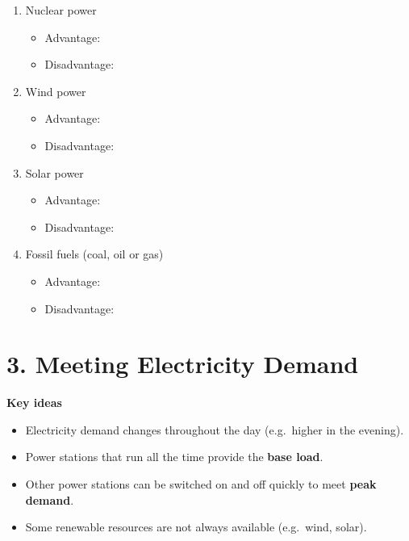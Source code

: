 \documentclass[11pt,a4paper]{article}
\begin{document}
\begin{enumerate}[label=\arabic*)]
    \item Nuclear power
    \begin{itemize}
        \item Advantage:
        \vspace{5cm}
        \item Disadvantage:
        \vspace{6cm}
    \end{itemize}

    \item Wind power
    \begin{itemize}
        \item Advantage:
        \vspace{3cm}
        \item Disadvantage:
        \vspace{3cm}
    \end{itemize}

    \item Solar power
    \begin{itemize}
        \item Advantage:
        \vspace{3cm}
        \item Disadvantage:
        \vspace{3cm}
    \end{itemize}

    \item Fossil fuels (coal, oil or gas)
    \begin{itemize}
        \item Advantage:
        \vspace{3cm}
        \item Disadvantage:
        \vspace{3cm}
    \end{itemize}
\end{enumerate}

\newpage

\section*{3. Meeting Electricity Demand}

\textbf{Key ideas}

\begin{itemize}[noitemsep]
    \item Electricity demand changes throughout the day (e.g.\ higher in the evening).
    \item Power stations that run all the time provide the \textbf{base load}.
    \item Other power stations can be switched on and off quickly to meet \textbf{peak demand}.
    \item Some renewable resources are not always available (e.g.\ wind, solar).
\end{itemize}
\end{document}
